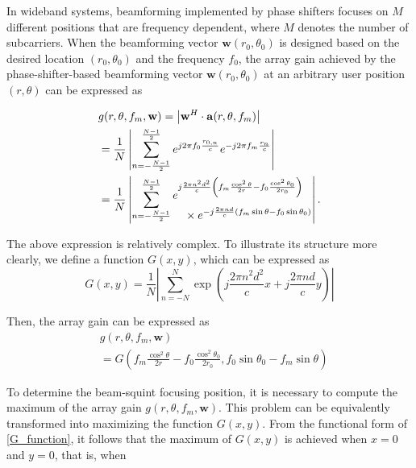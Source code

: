\documentclass[lettersize,journal]{IEEEtran}
\begin{document}
In wideband systems, beamforming implemented by phase shifters focuses on $M$ different positions that are frequency dependent, where $M$ denotes the number of subcarriers. When the beamforming vector $\mathbf{w}(r_0, \theta_0)$ is designed based on the desired location $(r_0, \theta_0)$ and the frequency $f_0$, the array gain achieved by the phase-shifter-based beamforming vector $\mathbf{w}(r_0, \theta_0)$ at an arbitrary user position $(r, \theta)$ can be expressed as


\begin{align}
    &g(r,\theta, f_{m},\mathbf{w}) = \left| \mathbf{w}^{H} \cdot \mathbf{a}(r,\theta, f_{m}) \right|  \notag\\
    &= \frac{1}{N} \left| \sum_{n=-\frac{N-1}{2}}^{\frac{N-1}{2}} e^{j2\pi f_{0}\frac{r_{0,n}}{c}} e^{-j2\pi f_{m}\frac{r_{n}}{c}} \right| \notag \\
    &= \frac{1}{N} \left| \sum_{n=-\frac{N-1}{2}}^{\frac{N-1}{2}} 
    \begin{aligned}
        &e^{j\frac{2\pi n^2 d^2}{c} \left(f_m \frac{\cos^2 \theta}{2r} - f_0 \frac{\cos^2 \theta_0}{2r_0}\right)} \\ %
        &\quad \times e^{-j\frac{2\pi nd}{c} \left(f_m \sin \theta - f_0 \sin \theta_0\right)}
    \end{aligned}
    \right|.
\end{align}


The above expression is relatively complex. To illustrate its structure more clearly, we define a function $G(x,y)$, which can be expressed as
\begin{equation}
\label{G_function}
	G(x, y) = \frac{1}{N} \left| \sum_{n=-N}^{N} \exp\left(j\frac{2\pi n^2 d^2}{c} x + j \frac{2\pi nd}{c} y\right) \right|
\end{equation}

Then, the array gain can be expressed as
\begin{equation}
\begin{aligned}
    &g(r,\theta, f_{m},\mathbf{w}) \\
    &= G\left(f_m \frac{\cos^2 \theta}{2r} - f_0 \frac{\cos^2 \theta_0}{2r_0}, f_0 \sin \theta_0 - f_m \sin \theta\right)
\end{aligned}
\end{equation}

To determine the beam-squint focusing position, it is necessary to compute the maximum of the array gain $g(r,\theta, f_{m},\mathbf{w})$. This problem can be equivalently transformed into maximizing the function $G(x,y)$. From the functional form of \eqref{G_function}, it follows that the maximum of $G(x,y)$ is achieved when $x=0$ and $y=0$, that is, when
\end{document}
